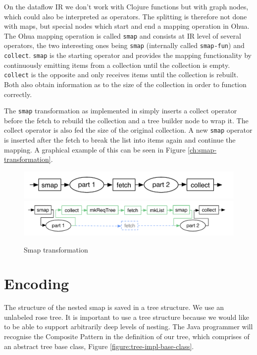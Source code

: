 On the dataflow IR we don't work with Clojure functions but with graph nodes, which could also be interpreted as operators.
The splitting is therefore not done with maps, but special nodes which start and end a mapping operation in Ohua.
The Ohua mapping operation is called \texttt{smap} and consists at IR level of several operators, the two interesting ones being \texttt{smap} (internally called \texttt{smap-fun}) and \texttt{collect}.
\texttt{smap} is the starting operator and provides the mapping functionality by continuously emitting items from a collection until the collection is empty.
\texttt{collect} is the opposite and only receives items until the collection is rebuilt.
Both also obtain information as to the size of the collection in order to function correctly.

The \texttt{smap} transformation as implemented in \yauhau{} simply inserts a collect operator before the fetch to rebuild the collection and a tree builder node to wrap it.
The collect operator is also fed the size of the original collection.
A new \texttt{smap} operator is inserted after the fetch to break the list into items again and continue the mapping.
A graphical example of this can be seen in Figure \ref{ch:smap-transformation}.

\begin{figure}[h]
	\includegraphics[width=.5\textwidth]{Figures/smap-rewrite-original}
	\includegraphics[width=.5\textwidth]{Figures/smap-rewrite}
	\label{figure:smap-transformation}
	\caption{Smap transformation}
\end{figure}

\section{Encoding}

The structure of the nested smap is saved in a tree structure.
We use an unlabeled rose tree.
It is important to use a tree structure because we would like to be able to support arbitrarily deep levels of nesting.
The Java programmer will recognise the Composite Pattern in the definition of our tree, which comprises of an abstract tree base class, Figure \ref{figure:tree-impl-base-class}.

